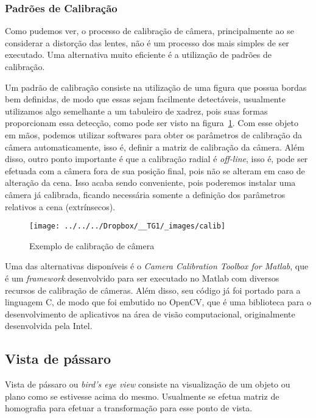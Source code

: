 \documentclass[ecp,tc]{iiufrgs}
\begin{document}
\subsubsection{Padrões de Calibração}
\label{calibpat}

Como pudemos ver, o processo de calibração de câmera, principalmente ao se considerar a distorção das lentes, não é um processo dos mais simples de ser executado. Uma alternativa muito eficiente é a utilização de padrões de calibração.

Um padrão de calibração consiste na utilização de uma figura que possua bordas bem definidas, de modo que essas sejam facilmente detectáveis, usualmente utilizamos algo semelhante a um tabuleiro de xadrez, pois suas formas proporcionam essa detecção, como pode ser visto na figura~\ref{fig:calib}. Com esse objeto em mãos, podemos utilizar softwares para obter os parâmetros de calibração da câmera automaticamente, isso é, definir a matriz de calibração da câmera. Além disso, outro ponto importante é que a calibração radial é \textit{off-line}, isso é, pode ser efetuada com a câmera fora de sua posição final, pois não se alteram em caso de alteração da cena. Isso acaba sendo conveniente, pois poderemos instalar uma câmera já calibrada, ficando necessária somente a definição dos parâmetros relativos a cena (extrínsecos).

\begin{figure}
	\centering
	\caption{Exemplo de calibração de câmera}
	\texttt{[image: ../../../Dropbox/\_\_TG1/\_images/calib]}
	\label{fig:calib}
\end{figure}

Uma das alternativas disponíveis é o \textit{Camera Calibration Toolbox for Matlab}, que é um \textit{framework} desenvolvido para ser executado no Matlab com diversos recursos de calibração de câmeras. Além disso, seu código já foi portado para a linguagem C, de modo que foi embutido no OpenCV, que é uma biblioteca para o desenvolvimento de aplicativos na área de visão computacional, originalmente desenvolvida pela Intel.

\subsection{Vista de pássaro}
\label{birds}

Vista de pássaro ou \textit{bird's eye view} consiste na visualização de um objeto ou plano como se estivesse acima do mesmo. Usualmente se efetua matriz de homografia para efetuar a transformação para esse ponto de vista.
\end{document}
